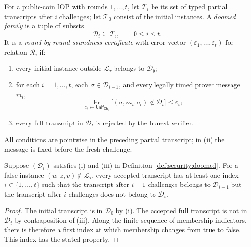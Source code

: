 \begin{definition}\label{def:security:doomed}
For a public-coin IOP with rounds $1,\ldots,t$, let $\mathscr T_i$ be its set of typed partial transcripts after $i$ challenges; let $\mathscr T_0$ consist of the initial instances. A \emph{doomed family} is a tuple of subsets
\[
 \mathscr D_i\subseteq\mathscr T_i,\qquad 0\leq i\leq t.
\]
It is a \emph{round-by-round soundness certificate} with error vector
$(\varepsilon_1,\ldots,\varepsilon_t)$ for relation $\mathcal R_\tau$ if:
\begin{enumerate}[label=\textup{(\roman*)}]
\item every initial instance outside $\mathcal L_\tau$ belongs to $\mathscr D_0$;
\item for each $i=1,\ldots,t$, each $\sigma\in\mathscr D_{i-1}$, and every legally timed prover message $m_i$,
\[
 \Pr_{c_i\leftarrow\mathsf{Unif}_{\mathsf{Ch}_i}}
 \bigl[(\sigma,m_i,c_i)\notin\mathscr D_i\bigr]\leq\varepsilon_i;
\]
\item every full transcript in $\mathscr D_t$ is rejected by the honest verifier.
\end{enumerate}
All conditions are pointwise in the preceding partial transcript; in (ii) the message is fixed before the fresh challenge.
\end{definition}

\begin{lemma}\label{lem:security:first-escape}
Suppose $(\mathscr D_i)$ satisfies (i) and (iii) in Definition~\ref{def:security:doomed}. For a false instance $(w;z,v)\notin\mathcal L_\tau$, every accepted transcript has at least one index $i\in\{1,\ldots,t\}$ such that the transcript after $i-1$ challenges belongs to $\mathscr D_{i-1}$ but the transcript after $i$ challenges does not belong to $\mathscr D_i$.
\end{lemma}
\begin{proof}
The initial transcript is in $\mathscr D_0$ by (i). The accepted full transcript is not in $\mathscr D_t$ by contraposition of (iii). Along the finite sequence of membership indicators, there is therefore a first index at which membership changes from true to false. This index has the stated property.
\end{proof}

